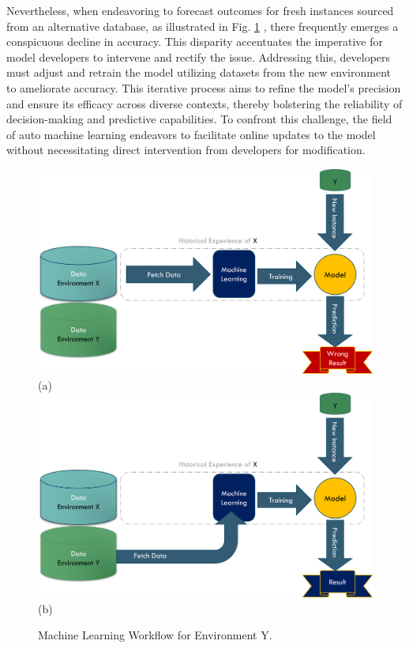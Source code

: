 Nevertheless, when endeavoring to forecast outcomes for fresh instances sourced from an alternative database, as illustrated in Fig. \ref{fig:machine-new-senario}
, there frequently emerges a conspicuous decline in accuracy. This disparity accentuates the imperative for model developers to intervene and rectify the issue. Addressing this, developers must adjust and retrain the model utilizing datasets from the new environment to ameliorate accuracy. This iterative process aims to refine the model's precision and ensure its efficacy across diverse contexts, thereby bolstering the reliability of decision-making and predictive capabilities. To confront this challenge, the field of auto machine learning endeavors to facilitate online updates to the model without necessitating direct intervention from developers for modification.

\begin{figure}[!ht]
    \centering
    \includegraphics[width=.8\textwidth]{1_introduction/figures/PNG/wrong_machine_flow_1.png}\\
    (a) \\
    \includegraphics[width=.8\textwidth]{1_introduction/figures/PNG/wrong_machine_flow_2.png}\\
    (b)
    \caption{Machine Learning Workflow for Environment Y.}
    \label{fig:machine-new-senario}
\end{figure}



